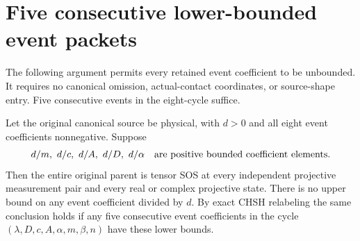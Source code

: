 \section[Five consecutive lower-bounded event packets]{Five consecutive lower-bounded event packets}
\label{sec:five-retained-events}

The following argument permits every retained event coefficient to be
unbounded. It requires no canonical omission, actual-contact coordinates,
or source-shape entry. Five consecutive events in the eight-cycle suffice.

\begin{theorem}
\label{thm:five-retained-events}
Let the original canonical source be physical, with $d>0$ and all eight
event coefficients nonnegative. Suppose
\[
 d/m,\ d/c,\ d/A,\ d/D,\ d/\alpha
 \quad\hbox{are positive bounded coefficient elements}.
\]
Then the entire original parent is tensor SOS at every independent
projective measurement pair and every real or complex projective state.
There is no upper bound on any event coefficient divided by $d$.
By exact CHSH relabeling the same conclusion holds if any five
consecutive event coefficients in the cycle
$(\lambda,D,c,A,\alpha,m,\beta,n)$ have these lower bounds.
\end{theorem}

